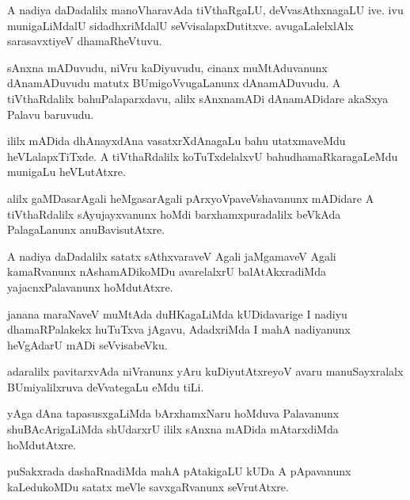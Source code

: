 \begin{mng}
A nadiya daDadalilx manoVharavAda tiVthaRgaLU, deVvasAthxnagaLU ive. ivu munigaLiMdalU sidadhxriMdalU seVvisalapxDutitxve. avugaLalelxlAlx sarasavxtiyeV dhamaRheVtuvu.
\end{mng}

\begin{mng}
sAnxna mADuvudu, niVru kaDiyuvudu, cinanx muMtAduvanunx dAnamADuvudu matutx BUmigoVvugaLanunx dAnamADuvudu. A tiVthaRdalilx bahuPalaparxdavu, alilx sAnxnamADi dAnamADidare akaSxya Palavu baruvudu.
\end{mng}

\begin{mng}
ililx mADida dhAnayxdAna vasatxrXdAnagaLu bahu utatxmaveMdu heVLalapxTiTxde. A tiVthaRdalilx koTuTxdelalxvU bahudhamaRkaragaLeMdu munigaLu heVLutAtxre.
\end{mng}

\begin{mng}
alilx gaMDasarAgali heMgasarAgali pArxyoVpaveVshavanunx mADidare A tiVthaRdalilx sAyujayxvanunx hoMdi barxhamxpuradalilx beVkAda PalagaLanunx anuBavisutAtxre.
\end{mng}

\begin{mng}
A nadiya daDadalilx satatx sAthxvaraveV Agali jaMgamaveV Agali kamaRvanunx nAshamADikoMDu avarelalxrU balAtAkxradiMda yajacnxPalavanunx hoMdutAtxre.
\end{mng}

\begin{mng}
janana maraNaveV muMtAda duHKagaLiMda kUDidavarige I nadiyu dhamaRPalakekx huTuTxva jAgavu, AdadxriMda I mahA nadiyanunx heVgAdarU mADi seVvisabeVku.
\end{mng}

\begin{mng}
adaralilx pavitarxvAda niVranunx yAru kuDiyutAtxreyoV avaru manuSayxralalx BUmiyalilxruva deVvategaLu eMdu tiLi.
\end{mng}

\begin{mng}
yAga dAna tapasusxgaLiMda bArxhamxNaru hoMduva Palavanunx shuBAcArigaLiMda shUdarxrU ililx sAnxna mADida mAtarxdiMda hoMdutAtxre.
\end{mng}

\begin{mng}
puSakxrada dashaRnadiMda mahA pAtakigaLU kUDa A pApavanunx kaLedukoMDu satatx meVle savxgaRvanunx seVrutAtxre.
\end{mng}


